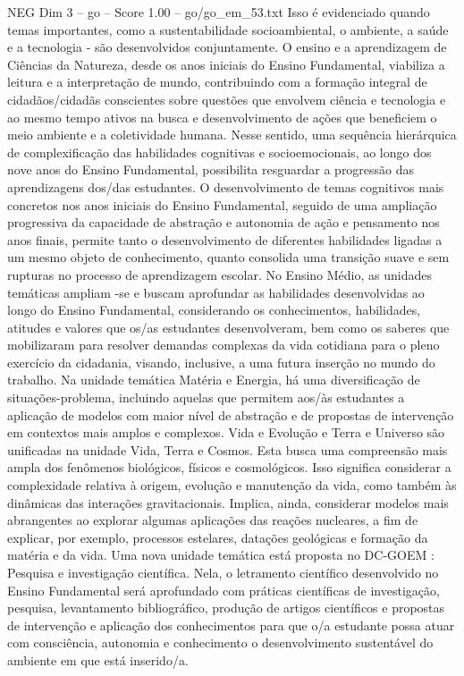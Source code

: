 \begin{textsample}{NEG Dim 3 – go – Score 1.00 – go/go\_em\_53.txt}
Isso é evidenciado quando temas importantes, como a sustentabilidade socioambiental, o ambiente, a saúde e a tecnologia - são desenvolvidos conjuntamente.
O ensino e a aprendizagem de Ciências da Natureza, desde os anos iniciais do Ensino Fundamental, viabiliza a leitura e a interpretação de mundo, contribuindo com a formação integral de cidadãos/cidadãs conscientes sobre questões que envolvem ciência e tecnologia e ao mesmo tempo ativos na busca e desenvolvimento de ações que beneficiem o meio ambiente e a coletividade humana.
Nesse sentido, uma sequência hierárquica de complexificação das habilidades cognitivas e socioemocionais, ao longo dos nove anos do Ensino Fundamental, possibilita resguardar a progressão das aprendizagens dos/das estudantes.
O desenvolvimento de temas cognitivos mais concretos nos anos iniciais do Ensino Fundamental, seguido de uma ampliação progressiva da capacidade de abstração e autonomia de ação e pensamento nos anos finais, permite tanto o desenvolvimento de diferentes habilidades ligadas a um mesmo objeto de conhecimento, quanto consolida uma transição suave e sem rupturas no processo de aprendizagem escolar.
No Ensino Médio, as unidades temáticas ampliam -se e buscam aprofundar as habilidades desenvolvidas ao longo do Ensino Fundamental, considerando os conhecimentos, habilidades, atitudes e valores que os/as estudantes desenvolveram, bem como os saberes que mobilizaram para resolver demandas complexas da vida cotidiana para o pleno exercício da cidadania, visando, inclusive, a uma futura inserção no mundo do trabalho.
Na unidade temática Matéria e Energia, há uma diversificação de situações-problema, incluindo aquelas que permitem aos/às estudantes a aplicação de modelos com maior nível de abstração e de propostas de intervenção em contextos mais amplos e complexos.
Vida e Evolução e Terra e Universo são unificadas na unidade Vida, Terra e Cosmos.
Esta busca uma compreensão mais ampla dos fenômenos biológicos, físicos e cosmológicos.
Isso significa considerar a complexidade relativa à origem, evolução e manutenção da vida, como também às dinâmicas das interações gravitacionais.
Implica, ainda, considerar modelos mais abrangentes ao explorar algumas aplicações das reações nucleares, a fim de explicar, por exemplo, processos estelares, datações geológicas e formação da matéria e da vida.
Uma nova unidade temática está proposta no DC-GOEM : Pesquisa e investigação científica.
Nela, o letramento científico desenvolvido no Ensino Fundamental será aprofundado com práticas científicas de investigação, pesquisa, levantamento bibliográfico, produção de artigos científicos e propostas de intervenção e aplicação dos conhecimentos para que o/a estudante possa atuar com consciência, autonomia e conhecimento o desenvolvimento sustentável do ambiente em que está inserido/a.

\end{textsample}

